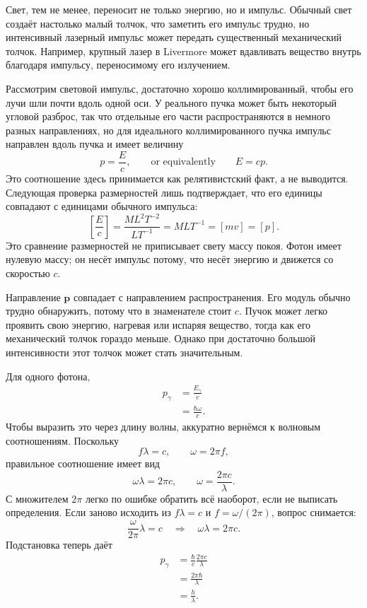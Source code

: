Свет, тем не менее, переносит не только энергию, но и импульс. Обычный свет создаёт настолько малый толчок, что заметить его импульс трудно, но интенсивный лазерный импульс может передать существенный механический толчок. Например, крупный лазер в Livermore может вдавливать вещество внутрь благодаря импульсу, переносимому его излучением.

Рассмотрим световой импульс, достаточно хорошо коллимированный, чтобы его лучи шли почти вдоль одной оси. У реального пучка может быть некоторый угловой разброс, так что отдельные его части распространяются в немного разных направлениях, но для идеального коллимированного пучка импульс направлен вдоль пучка и имеет величину
\begin{equation}
p=\frac{E}{c},
\qquad\text{or equivalently}\qquad
E=cp.
\end{equation}
Это соотношение здесь принимается как релятивистский факт, а не выводится. Следующая проверка размерностей лишь подтверждает, что его единицы совпадают с единицами обычного импульса:
\begin{equation}
\left[\frac{E}{c}\right]
=
\frac{M L^2 T^{-2}}{L T^{-1}}
=
M L T^{-1}
=
[m v]
=
[p].
\end{equation}
Это сравнение размерностей не приписывает свету массу покоя. Фотон имеет нулевую массу; он несёт импульс потому, что несёт энергию и движется со скоростью \(c\).

Направление \(\mathbf p\) совпадает с направлением распространения. Его модуль обычно трудно обнаружить, потому что в знаменателе стоит \(c\). Пучок может легко проявить свою энергию, нагревая или испаряя вещество, тогда как его механический толчок гораздо меньше. Однако при достаточно большой интенсивности этот толчок может стать значительным.

Для одного фотона,
\begin{align}
p_\gamma
&=\frac{E_\gamma}{c}\\
&=\frac{\hbar\omega}{c}.
\end{align}
Чтобы выразить это через длину волны, аккуратно вернёмся к волновым соотношениям. Поскольку
\begin{equation}
f\lambda=c,
\qquad
\omega=2\pi f,
\end{equation}
правильное соотношение имеет вид
\begin{equation}
\omega\lambda=2\pi c,
\qquad
\omega=\frac{2\pi c}{\lambda}.
\end{equation}
С множителем \(2\pi\) легко по ошибке обратить всё наоборот, если не выписать определения. Если заново исходить из \(f\lambda=c\) и \(f=\omega/(2\pi)\), вопрос снимается:
\begin{equation}
\frac{\omega}{2\pi}\lambda=c
\quad\Longrightarrow\quad
\omega\lambda=2\pi c.
\end{equation}
Подстановка теперь даёт
\begin{align}
p_\gamma
&=\frac{\hbar}{c}\frac{2\pi c}{\lambda}\\
&=\frac{2\pi\hbar}{\lambda}\\
&=\frac{h}{\lambda}.
\end{align}

